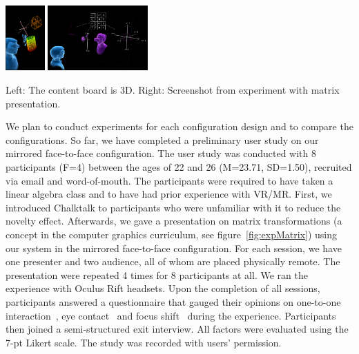 \documentclass[sigchi-a]{acmart}
\begin{document}
\begin{marginfigure}
    \includegraphics[height = 2.5cm]{3d.png}
    \includegraphics[height = 2.5cm]{experimentMatrix.png}
    \caption{Left: The content board is 3D. Right: Screenshot from experiment with matrix presentation.}
    \label{fig:expMatrix}
\end{marginfigure}

We plan to conduct experiments for each configuration design and to compare the configurations. So far, we have completed a preliminary user study on our mirrored face-to-face configuration.
The user study was conducted with 8 participants (F=4) between the ages of 22 and 26 (M=23.71, SD=1.50), recruited via email and word-of-mouth.
The participants were required to have taken a linear algebra class and to have had prior experience with VR/MR. First, we introduced Chalktalk to participants who were unfamiliar with it to reduce the novelty effect. Afterwards, we gave a presentation on matrix transformations (a concept in the computer graphics curriculum, see figure~\ref{fig:expMatrix}) using our system in the mirrored face-to-face configuration. For each session, we have one presenter and two audience, all of whom are placed physically remote. The presentation were repeated 4 times for 8 participants at all. 
We ran the experience with Oculus Rift headsets. Upon the completion of all sessions, participants answered a questionnaire that gauged their opinions on one-to-one interaction~\cite{Lanir2008ClassroomPresentationSoftware}, eye contact~\cite{InsaPositionInClassroom} and focus shift~\cite{buxton1992telepresence} during the experience. Participants then joined a semi-structured exit interview. All factors were evaluated using the 7-pt Likert scale. The study was recorded with users' permission.
\end{document}
